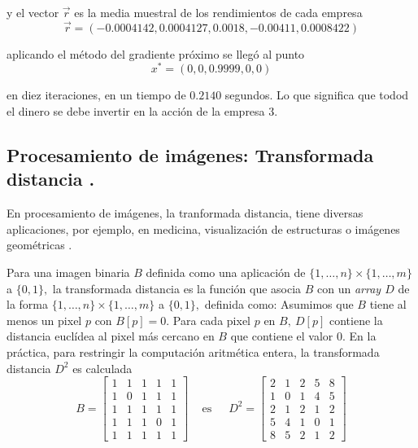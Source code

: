 y el vector $\vec{r} $ es la media muestral de los rendimientos de cada empresa
\[\vec{r} = (−0.0004142, 0.0004127, 0.0018, −0.00411, 0.0008422)\]

aplicando el m\'etodo del gradiente pr\'oximo se lleg\'o al punto
\[x^{*} = (0, 0, 0.9999, 0, 0)\]

en diez iteraciones, en un tiempo de $0.2140$ segundos. Lo que significa que todod el dinero se debe invertir en la acci\'on de la empresa 
$3.$


\subsection{Procesamiento de im\'agenes: Transformada distancia \cite{lara}.}

En procesamiento de im\'agenes, la tranformada distancia, tiene diversas aplicaciones, por ejemplo, en medicina, visualizaci\'on de
estructuras o im\'agenes geom\'etricas \cite{lara}. %
\medskip

Para una imagen binaria $B$ definida como una aplicaci\'on de $\{1, \ldots , n\} \times \{1, \ldots , m\} $ a $ \{0, 1\},$ la transformada
distancia es la funci\'on que asocia $B$ con un {\it array $ D $} de la forma $ \{1, \ldots , n\} \times \{1, \ldots , m\} $ a $ \{0, 1\},$
definida como: Asumimos que $B$ tiene al menos un pixel $p$ con $B[p] = 0.$ Para cada pixel $ p $ en $ B,\ D[p] $ contiene la distancia 
eucl\'idea al pixel m\'as cercano en $ B $ que contiene el valor $0.$ En la pr\'actica, para restringir la computaci\'on aritm\'etica entera,
la transformada distancia $ D^2 $ es calculada\\ 

$$B = \begin{bmatrix}
   1 & 1 & 1 & 1 & 1\\
   1 & 0 & 1 & 1 & 1\\
   1 & 1 & 1 & 1 & 1\\
   1 & 1 & 1 & 0 & 1\\
   1 & 1 & 1 & 1 & 1
\end{bmatrix} \,\,\,\,\,\mbox{    es    }\,\,\,\,\,\,\,
D^2 =
\begin{bmatrix}
   2 & 1 & 2 & 5 & 8\\
   1 & 0 & 1 & 4 & 5\\
   2 & 1 & 2 & 1 & 2 \\
   5 & 4 & 1 & 0 & 1\\
   8 & 5 & 2 & 1 & 2
\end{bmatrix}
$$
~\\

